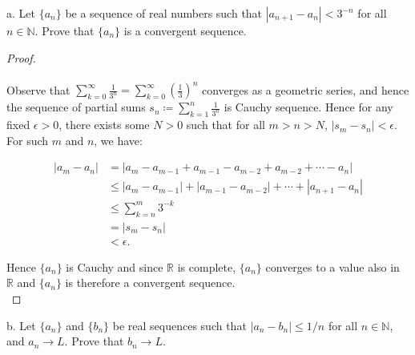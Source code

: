 a.  Let $\{a_n\}$ be a sequence of real numbers such that 
    $|a_{n+1} - a_n| < 3^{-n}$ for all $n \in \mathbb{N}$. Prove that $\{a_n\}$
    is a convergent sequence.  \\

    \begin{proof}\ \\\\
        Observe that $\sum\limits_{k=0}^{\infty}{\frac{1}{3^{n}}} = \sum\limits_{k=0}^{\infty}{\left(\frac{1}{3}\right)^n}$
        converges as a geometric series, and hence the sequence of partial sums 
        $s_n \coloneqq \sum\limits_{k=1}^{n}{\frac{1}{3^{n}}}$ is Cauchy
        sequence.  Hence for any fixed $\epsilon > 0$, there exists some $N > 0$
        such that for all $m > n > N$, $|s_m - s_n| < \epsilon$. For such $m$ 
        and $n$, we have:
    
        \begin{align*}
            |a_m - a_n| &= |a_m - a_{m-1} + a_{m-1} - a_{m-2} + a_{m-2} + \cdots - a_n | \\
                        &\le |a_m - a_{m-1}| + |a_{m-1} - a_{m-2}| + \cdots + |a_{n+1} - a_n | \\
                        &\le \sum\limits_{k=n}^m{3^{-k}} \\ 
                        &= |s_m - s_n| \\
                        &< \epsilon.
        \end{align*}
    
        Hence $\{a_n\}$ is Cauchy and since $\mathbb{R}$ is complete, $\{a_n\}$
        converges to a value also in $\mathbb{R}$ and $\{a_n\}$ is therefore a
        convergent sequence.
        \\
    \end{proof}
    \pagebreak

b.  Let $\{a_n\}$ and $\{b_n\}$ be real sequences such that
    $|a_n - b_n| \le 1/n$ for all $n \in \mathbb{N}$, and $a_n \rightarrow L$.
    Prove that $b_n \rightarrow L$. \\

